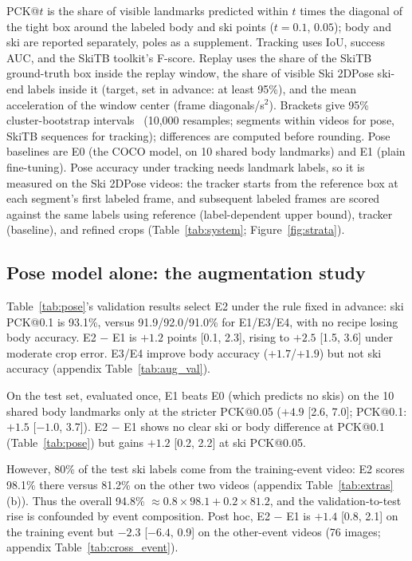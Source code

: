 \documentclass{article}
\begin{document}
PCK@$t$ is the share of visible landmarks predicted within $t$ times the diagonal of the tight box around the labeled
body and ski points ($t=0.1$, $0.05$); body and ski are reported separately, poles as a supplement. Tracking uses IoU,
success AUC, and the SkiTB toolkit's F-score. Replay uses the share of the SkiTB ground-truth box inside the replay
window, the share of visible Ski 2DPose ski-end labels inside it (target, set in advance: at least 95\%), and the mean
acceleration of the window center (frame diagonals/s$^2$). Brackets give 95\%
cluster-bootstrap intervals~\cite{efron1994introduction} (10,000 resamples; segments within videos for pose, SkiTB
sequences for tracking); differences are computed before rounding. Pose baselines are E0 (the COCO model, on 10 shared body
landmarks) and E1 (plain fine-tuning). Pose accuracy under tracking needs landmark labels, so it is measured on the
Ski 2DPose videos: the tracker starts from the reference box at each segment's first labeled frame, and subsequent labeled
frames are scored against the same labels using reference (label-dependent upper bound), tracker (baseline), and
refined crops (Table~\ref{tab:system}; Figure~\ref{fig:strata}).

\subsection{Pose model alone: the augmentation study}
\label{sec:pose_alone}
Table~\ref{tab:pose}'s validation results select E2 under the rule fixed in advance: ski PCK@0.1 is 93.1\%, versus
91.9/92.0/91.0\% for E1/E3/E4, with no recipe losing body accuracy. E2 $-$ E1 is $+1.2$ points [0.1, 2.3], rising to
$+2.5$ [1.5, 3.6] under moderate crop error. E3/E4 improve body accuracy ($+1.7$/$+1.9$) but not ski accuracy (appendix Table~\ref{tab:aug_val}).

On the test set, evaluated once, E1 beats E0 (which predicts no skis) on the 10 shared body landmarks only at the
stricter PCK@0.05 ($+4.9$ [2.6, 7.0]; PCK@0.1: $+1.5$ [$-1.0$, 3.7]). E2 $-$ E1
shows no clear ski or body difference at PCK@0.1 (Table~\ref{tab:pose}) but gains $+1.2$ [0.2, 2.2] at ski PCK@0.05.

However, 80\% of the test ski labels come from the training-event video: E2 scores 98.1\% there versus 81.2\% on the
other two videos (appendix Table~\ref{tab:extras}(b)). Thus the
overall 94.8\% $\approx 0.8\times98.1 + 0.2\times81.2$, and the validation-to-test rise is confounded by event
composition. Post hoc, E2 $-$ E1 is $+1.4$ [0.8, 2.1] on the training event but $-2.3$ [$-6.4$, 0.9] on the
other-event videos (76 images; appendix Table~\ref{tab:cross_event}).
\end{document}
